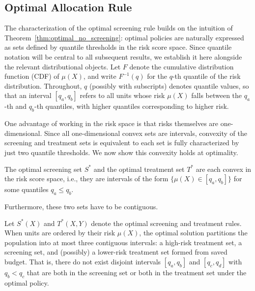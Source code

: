 \subsection{Optimal Allocation Rule}

The characterization of the optimal screening rule builds on the intuition of Theorem~\ref{thm:optimal_no_screening}: optimal policies are naturally expressed as sets defined by quantile thresholds in the risk score space. Since quantile notation will be central to all subsequent results, we establish it here alongside the relevant distributional objects. Let $F$ denote the cumulative distribution function (CDF) of $\mu(X)$, and write $F^{-1}(q)$ for the $q$-th quantile of the risk distribution. Throughout, $q$ (possibly with subscripts) denotes quantile values, so that an interval $[q_a, q_b]$ refers to all units whose risk $\mu(X)$ falls between the $q_a$-th and $q_b$-th quantiles, with higher quantiles corresponding to higher risk.

One advantage of working in the risk space is that risks themselves are one-dimensional. Since all one-dimensional convex sets are intervals, convexity of the screening and treatment sets is equivalent to each set is fully characterized by just two quantile thresholds. We now show this convexity holds at optimality.

\begin{proposition}
\label{prop:convexity}
The optimal screening set $S^*$ and the optimal treatment set $T^*$ are each convex in the risk score space, i.e., they are intervals of the form $\{\mu(X) \in [q_a, q_b]\}$ for some quantiles $q_a \leq q_b$.
\end{proposition}

Furthermore, these two sets have to be contiguous.

\begin{proposition}
\label{prop:contiguity}
    Let $S^*(X)$ and $T^*(X,Y)$ denote the optimal screening and treatment rules. When units are ordered by their risk $\mu(X)$, the optimal solution partitions the population into at most three contiguous intervals: a high-risk treatment set, a screening set, and (possibly) a lower-risk treatment set formed from saved budget. That is, there do not exist disjoint intervals $[q_a, q_b]$ and $[q_c, q_d]$ with $q_b < q_c$ that are both in the screening set or both in the treatment set under the optimal policy.
\end{proposition}

